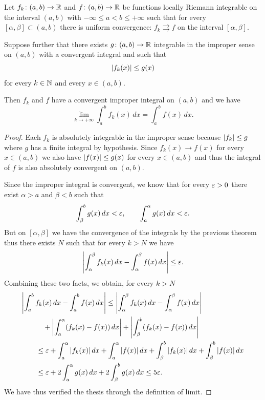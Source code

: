 \begin{theorem}%
  \label{th:convergenza_dominata_uniforme}%
%
  Let $f_k\colon (a,b) \to {\mathbb R}$ and $f\colon (a,b)\to {\mathbb R}$ be functions 
  locally Riemann integrable
  on the interval $(a,b)$ with $-\infty \le a < b \le +\infty$
  such that for every $[\alpha,\beta]\subset (a,b)$ 
  there is uniform convergence: $f_k\rightrightarrows f$ 
  on the interval $[\alpha,\beta]$.
  
  Suppose further that there exists $g\colon (a,b)\to {\mathbb R}$
    integrable in the improper sense on $(a,b)$ with a convergent integral and
  such
  that
  \[
  {\left|f_k(x)\right|}\le g(x)
  \]
  for every $k\in {\mathbb N}$ and every $x\in (a,b)$.
    
  Then $f_k$ and $f$ have a convergent improper integral on $(a,b)$ and we have
  \[
    \lim_{k\to+\infty} \int_a^b f_k(x)\, dx = \int_a^b f(x)\, dx.
  \]
\end{theorem}
%
\begin{proof}
  Each $f_k$ is absolutely integrable in the improper sense because
  ${\left|f_k\right|}\le g$ where $g$ has a finite integral by hypothesis.
  Since $f_k(x)\to f(x)$ for every $x\in (a,b)$
  we also have ${\left|f(x)\right|}\le g(x)$ for every $x\in (a,b)$ 
  and thus the integral of $f$ is also absolutely convergent on $(a,b)$.
  
  Since the improper integral is convergent, we know that 
  for every $\varepsilon>0$ there exist $\alpha>a$ and $\beta<b$ such that
  \[
    \int_\beta^b g(x)\, dx < \varepsilon, \qquad 
    \int_a^\alpha g(x)\, dx < \varepsilon.
  \]
    But on $[\alpha ,\beta]$ we have the convergence of the integrals by the
  previous theorem
  thus there exists $N$ such that for every $k > N$ we have 
  \[
   {\left|\int_\alpha^\beta f_k(x)\, dx - \int_\alpha^\beta f(x)\, dx\right|} \le \varepsilon. 
  \]
  Combining these two facts, we obtain,
  for every $k>N$
  \begin{align*}
    \MoveEqLeft{\abs{\int_a^b f_k(x)\, dx - \int_a^b f(x)\, dx}} \le \abs{\int_\alpha^\beta f_k(x)\, dx - \int_\alpha^\beta f(x)\, dx} \\
    & \quad + \abs{\int_a^\alpha (f_k(x) - f(x))\, dx }
      + \abs{\int_\beta^b (f_k(x) - f(x))\, dx } \\
    &\le \eps 
    + \int_a^\alpha \abs{f_k(x)}\, dx + \int_a^\alpha\abs{f(x)}\, dx
    + \int_\beta^b \abs{f_k(x)}\, dx + \int_\beta^b\abs{f(x)}\, dx\\
    &\le \eps 
    + 2 \int_a^\alpha g(x)\,dx
    + 2 \int_\beta^b g(x)\,dx 
    \le 5 \eps.
  \end{align*}
  We have thus verified the thesis through the definition of limit.
\end{proof}

